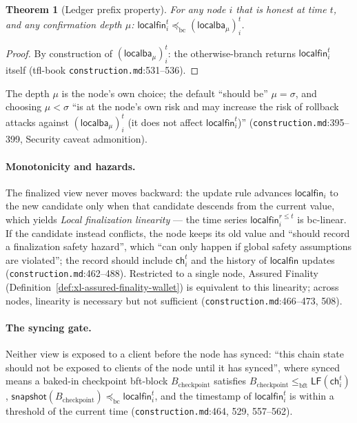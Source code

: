 \documentclass[11pt,a4paper]{article}
\newtheorem{theorem}{Theorem}[section]
\theoremstyle{definition}
\begin{document}
\begin{theorem}[Ledger prefix property]\label{thm:xl-ledger-prefix-wallet}
For any node $i$ that is honest at time $t$, and any confirmation depth
$\mu$: $\mathsf{localfin}_i^t \preceq_{\mathrm{bc}}
(\mathsf{localba}_{\mu})_i^t$.
\end{theorem}
\begin{proof}
By construction of $(\mathsf{localba}_{\mu})_i^t$: the otherwise-branch
returns $\mathsf{localfin}_i^t$ itself (tfl-book
\texttt{construction.md}:531--536).
\end{proof}

The depth $\mu$ is the node's own choice; the default ``should be'' $\mu =
\sigma$, and choosing $\mu < \sigma$ ``is at the node's own risk and may
increase the risk of rollback attacks against
$(\mathsf{localba}_{\mu})_i^t$ (it does not affect
$\mathsf{localfin}_i^t$)'' (\texttt{construction.md}:395--399, Security
caveat admonition).

\paragraph{Monotonicity and hazards.} The finalized view never moves
backward: the update rule advances $\mathsf{localfin}_i$ to the new
candidate only when that candidate descends from the current value, which
yields \emph{Local finalization linearity} --- the time series
$\mathsf{localfin}_i^{r \le t}$ is bc-linear. If the candidate instead
conflicts, the node keeps its old value and ``should record a finalization
safety hazard'', which ``can only happen if global safety assumptions are
violated''; the record should include $\mathsf{ch}_i^t$ and the history of
$\mathsf{localfin}$ updates (\texttt{construction.md}:462--488). Restricted
to a single node, Assured Finality
(Definition~\ref{def:xl-assured-finality-wallet})
is equivalent to this linearity; across nodes, linearity is necessary but
not sufficient (\texttt{construction.md}:466--473, 508).

\paragraph{The syncing gate.} Neither view is exposed to a client before
the node has synced: ``this chain state should not be exposed to clients of
the node until it has synced'', where synced means a baked-in checkpoint
bft-block $B_{\mathrm{checkpoint}}$ satisfies $B_{\mathrm{checkpoint}}
\le_{\mathrm{bft}} \mathsf{LF}(\mathsf{ch}_i^t)$,
$\mathsf{snapshot}(B_{\mathrm{checkpoint}}) \preceq_{\mathrm{bc}}
\mathsf{localfin}_i^t$, and the timestamp of $\mathsf{localfin}_i^t$ is
within a threshold of the current time
(\texttt{construction.md}:464, 529, 557--562).
\end{document}
